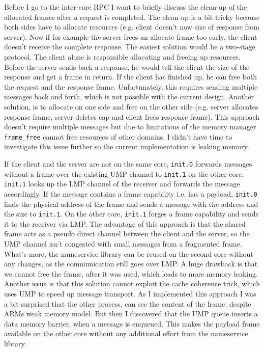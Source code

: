 Before I go to the inter-core RPC I want to briefly discuss the clean-up of the allocated frames after a request is completed. The clean-up
is a bit tricky because both sides have to allocate resources (e.g. client doesn't now size of response from server). Now if for example the
server frees an allocate frame too early, the client doesn't receive the complete response. The easiest solution would be a two-stage protocol.
The client alone is responsible allocating and freeing up resources. Before the server sends back a response, he would tell the client the
size of the response and get a frame in return. If the client has finished up, he can free both the request and the response frame.
Unfortunately, this requires sending multiple messages back and forth, which is not possible with the current design. Another solution, is to
allocate on one side and free on the other side (e.g. server allocates response frame, server deletes cap and client frees response frame).
This approach doesn't require multiple messages but due to limitations of the memory manager \verb|frame_free| cannot free resources
of other domains. I didn't have time to investigate this issue further so the current implementation is leaking memory.

If the client and the server are not on the same core, \verb|init.0| forwards messages without a frame over the existing UMP channel to 
\verb|init.1| on the other core. \verb|init.1| looks up the LMP channel of the receiver and forwards the message accordingly. If the 
message contains a frame capability i.e. has a payload, \verb|init.0| finds the physical address of the frame and sends a message 
with the address and the size to \verb|init.1|. On the other core, \verb|init.1| forges a frame capability and sends it to the receiver
via LMP. The advantage of this approach is that the shared frame acts as a pseudo direct channel between the client and the server, so
the UMP channel isn't congested with small messages from a fragmented frame. What's more, the nameservice library can be reused on the
second core without any changes, as the communication still goes over LMP. A huge drawback is that we cannot free the frame, after it
was used, which leads to more memory leaking. Another issue is that this solution cannot exploit the cache coherence trick, which uses UMP
to speed up message transport. As I implemented this approach I was a bit surprised that the other process, can see the content of the frame,
despite ARMs weak memory model. But then I discovered that the UMP queue inserts a data memory barrier, when a message is enqueued. This
makes the payload frame available on the other core without any additional effort from the nameservice library.

